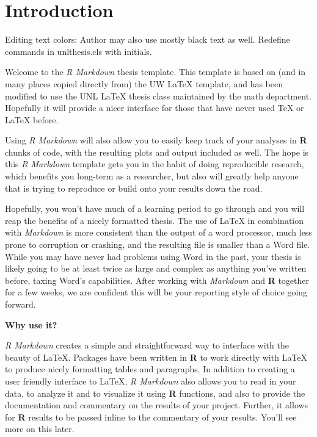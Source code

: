 \documentclass[print]{nuthesis}
\begin{document}
\hypertarget{introduction}{%
\chapter{Introduction}\label{introduction}}

Editing text colors:  Author may also use mostly black text as well.   Redefine commands in unlthesis.cls with initials.

Welcome to the \emph{R Markdown} thesis template. This template is based on (and in many places copied directly from) the UW LaTeX template, and has been modified to use the UNL LaTeX thesis class maintained by the math department. Hopefully it will provide a nicer interface for those that have never used TeX or LaTeX before.

Using \emph{R Markdown} will also allow you to easily keep track of your analyses in \textbf{R} chunks of code, with the resulting plots and output included as well. The hope is this \emph{R Markdown} template gets you in the habit of doing reproducible research, which benefits you long-term as a researcher, but also will greatly help anyone that is trying to reproduce or build onto your results down the road.

Hopefully, you won't have much of a learning period to go through and you will reap the benefits of a nicely formatted thesis. The use of LaTeX in combination with \emph{Markdown} is more consistent than the output of a word processor, much less prone to corruption or crashing, and the resulting file is smaller than a Word file. While you may have never had problems using Word in the past, your thesis is likely going to be at least twice as large and complex as anything you've written before, taxing Word's capabilities. After working with \emph{Markdown} and \textbf{R} together for a few weeks, we are confident this will be your reporting style of choice going forward.

\textbf{Why use it?}

\emph{R Markdown} creates a simple and straightforward way to interface with the beauty of LaTeX. Packages have been written in \textbf{R} to work directly with LaTeX to produce nicely formatting tables and paragraphs. In addition to creating a user friendly interface to LaTeX, \emph{R Markdown} also allows you to read in your data, to analyze it and to visualize it using \textbf{R} functions, and also to provide the documentation and commentary on the results of your project. Further, it allows for \textbf{R} results to be passed inline to the commentary of your results. You'll see more on this later.
\end{document}

